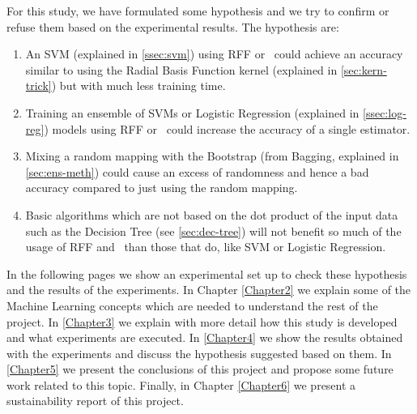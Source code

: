 \begin{pre-delivery}
  For this study, we have formulated some hypothesis and we try to confirm or
  refuse them based on the experimental results. The hypothesis are:
  \begin{enumerate}
    \item An SVM (explained in \ref{ssec:svm}) using RFF or \Nys\ could achieve an accuracy similar to
    using the Radial Basis Function kernel (explained in \ref{sec:kern-trick})
    but with much less training time.
    \item Training an ensemble of SVMs or Logistic Regression (explained in
    \ref{ssec:log-reg}) models using
    RFF or \Nys\ could increase the accuracy of a single estimator.
    \item Mixing a random mapping with the Bootstrap (from Bagging, explained
    in \ref{sec:ens-meth}) could cause
    an excess of randomness and hence a bad accuracy compared to just using
    the random mapping.
    \item Basic algorithms which are not based on the dot product of the
    input data such as the Decision Tree (see \ref{sec:dec-tree}) will not benefit so much of the
    usage of RFF and \Nys\ than those that do, like SVM or
    Logistic Regression.
  \end{enumerate}

  In the following pages we show an experimental set up to check these
  hypothesis and the results of the experiments. In Chapter \ref{Chapter2} we
  explain some of the Machine Learning concepts which are needed to understand
  the rest of the project. In \ref{Chapter3} we explain with more detail how
  this study is developed and what experiments are executed. In \ref{Chapter4}
  we show the results obtained with the experiments and discuss the hypothesis
  suggested based on them. In \ref{Chapter5} we present the conclusions of
  this project and propose some future work related to this topic. Finally,
  in Chapter \ref{Chapter6} we present a sustainability report of this project.

\end{pre-delivery}

